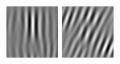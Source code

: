 \begin{figure}[ht]
\begin{center}
  \includegraphics[width=\columnwidth/9]{ch4/figures/real_2_0.jpg}
  \includegraphics[width=\columnwidth/9]{ch4/figures/real_2_1.jpg}

\end{center}
\end{figure}
